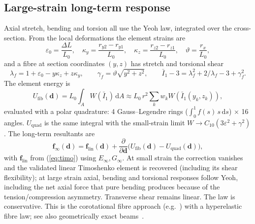 \documentclass[11pt,a4paper]{article}
\newcommand{\vect}[1]{\bm{#1}}
\newcommand{\dd}{\,\mathrm{d}}
\begin{document}
\subsection{Large-strain long-term response}
Axial stretch, bending and torsion all use the Yeoh law, integrated over the cross-section. From the local
deformations the element strains are
\begin{equation}
\varepsilon_0 = \frac{\Delta L}{L_0},\quad \kappa_y = \frac{r_{y2}-r_{y1}}{L_0},\quad
\kappa_z = \frac{r_{z2}-r_{z1}}{L_0},\quad \vartheta = \frac{r_x}{L_0},
\end{equation}
and a fibre at section coordinates $(y,z)$ has stretch and torsional shear
\begin{equation}
\lambda_f = 1 + \varepsilon_0 - y\kappa_z + z\kappa_y,\qquad \gamma_f = \vartheta\sqrt{y^2+z^2},\qquad
\bar I_1 - 3 = \lambda_f^2 + 2/\lambda_f - 3 + \gamma_f^2 .
\end{equation}
The element energy is
\begin{equation}
U_\mathrm{fib}(\vect{d}) = L_0 \int_{A} W\!\left(\bar I_1\right)\dd A \approx
L_0\, r^2 \sum_{k} w_k W\!\left(\bar I_1(y_k,z_k)\right),
\end{equation}
evaluated with a polar quadrature: 4 Gauss--Legendre rings ($\int_0^1 f(s)\,s\dd s$) $\times$ 16 angles.
$U_\mathrm{quad}$ is the same integral with the small-strain limit $W\to C_{10}(3\varepsilon^2+\gamma^2)$.
The long-term resultants are
\begin{equation}
\vect{f}_\infty(\vect{d}) = \vect{f}_\mathrm{lin}(\vect{d}) +
\frac{\partial}{\partial\vect{d}}\Big(U_\mathrm{fib}(\vect{d}) - U_\mathrm{quad}(\vect{d})\Big),
\label{eq:finf}
\end{equation}
with $\vect{f}_\mathrm{lin}$ from (\ref{eq:timo}) using $E_\infty, G_\infty$. At small strain the correction
vanishes and the validated linear Timoshenko element is recovered (including its shear flexibility); at large
strain axial, bending and torsional responses follow Yeoh, including the net axial force that pure bending
produces because of the tension/compression asymmetry. Transverse shear remains linear. The law is
conservative. This is the corotational fibre approach (e.g.\ \cite{battini2002}) with a hyperelastic fibre law;
see also geometrically exact beams~\cite{simo1985}.
\end{document}
